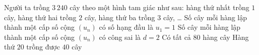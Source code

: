 \begin{ex}%
	Người ta trồng $3\,240$ cây theo một hình tam giác như sau: hàng thứ  nhất trồng $1$ cây, hàng thứ hai trồng $2$ cây, hàng thứ ba trồng $3$ cây, \ldots
	\choiceTF 
		{\True  Số cây mỗi hàng lập thành một cấp số cộng $(u_n)$ có số hạng đầu là $u_1=1$}
		{Số  cây mỗi hàng lập thành một cấp số cộng $(u_n)$ có công sai là $d=2$}
		{\True Có  tất cả $80$ hàng cây}
		{Hàng thứ $20$ trồng  được $40$ cây}
\end{ex}

